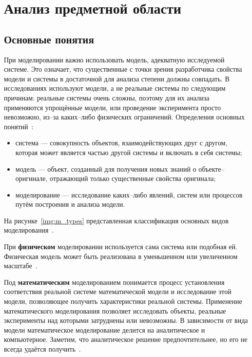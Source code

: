 \chapter{Анализ предметной области}

\section{Основные понятия}

При моделировании важно использовать модель, адекватную исследуемой системе. Это означает, что существенные с точки зрения разработчика свойства модели и системы в достаточной для анализа степени должны совпадать. В исследованиях используют модели, а не реальные системы по следующим причинам: реальные системы очень сложны, поэтому для их анализа применяются упрощённые модели, или проведение эксперимента просто невозможно, из--за каких--либо физических ограничений. Определения основных понятий~\cite{m_types}:
\begin{itemize}[label=---]
	\item система --- совокупность объектов, взаимодействующих друг с другом, которая может является частью другой системы и включать в себя системы;
	\item модель --- объект, созданный для получения новых знаний о объекте--оригинале, отражающий только существенные свойства оригинала;
	\item моделирование --- исследование каких--либо явлений, систем или процессов путём построения и анализа модели.
\end{itemize}

На рисунке~\ref{img:m_types} представленная классификация основных видов моделирования~\cite{m_types}.
\FloatBarrier

При \textbf{физическом} моделировании используется сама система или подобная ей. Физическая модель может быть реализована в уменьшенном или увеличенном масштабе~\cite{m_types}.

Под \textbf{математическим} моделированием понимается процесс установления соответствия реальной системе математической модели и исследование этой модели, позволяющее получить характеристики реальной системы. Применение математического моделирования позволяет исследовать объекты, реальные эксперименты над которыми затруднены или невозможны. В зависимости от вида модели математическое моделирование делится на аналитическое и компьютерное. Заметим, что аналитическое решение предпочтительнее, но его не всегда удаётся получить~\cite{m_types}.

